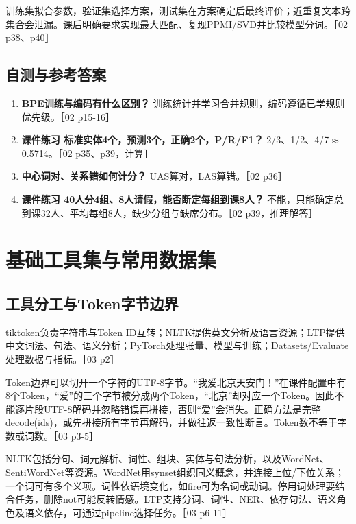 \documentclass[UTF8,a4paper,zihao=-4,fontset=windows]{ctexart}
\begin{document}
训练集拟合参数，验证集选择方案，测试集在方案确定后最终评价；近重复文本跨集合会泄漏。课后明确要求实现最大匹配、复现PPMI/\allowbreak{}SVD并比较模型分词。［02 p38、p40］

\subsection{自测与参考答案}
\begin{enumerate}
\item {}\textbf{BPE训练与编码有什么区别？} 训练统计并学习合并规则，编码遵循已学规则优先级。［02 p15-16］
\item {}\textbf{课件练习 标准实体4个，预测3个，正确2个，P/\allowbreak{}R/\allowbreak{}F1？} 2/\allowbreak{}3、1/\allowbreak{}2、4/\allowbreak{}7\ensuremath{\approx}0.5714。［02 p35、p39，计算］
\item {}\textbf{中心词对、关系错如何计分？} UAS算对，LAS算错。［02 p36］
\item {}\textbf{课件练习 40人分4组、8人请假，能否断定每组到课8人？} 不能，只能确定总到课32人、平均每组8人，缺少分组与缺席分布。［02 p39，推理解答］
\end{enumerate}
\section{基础工具集与常用数据集}
\subsection{工具分工与Token字节边界}
tiktoken负责字符串与Token ID互转；NLTK提供英文分析及语言资源；LTP提供中文词法、句法、语义分析；PyTorch处理张量、模型与训练；Datasets/\allowbreak{}Evaluate处理数据与指标。［03 p2］

Token边界可以切开一个字符的UTF-8字节。“我爱北京天安门！”在课件配置中有8个Token，“爱”的三个字节被分成两个Token，“北京”却对应一个Token。因此不能逐片段UTF-8解码并忽略错误再拼接，否则“爱”会消失。正确方法是完整decode(ids)，或先拼接所有字节再解码，并做往返一致性断言。Token数不等于字数或词数。［03 p3-5］

NLTK包括分句、词元解析、词性、组块、实体与句法分析，以及WordNet、SentiWordNet等资源。WordNet用synset组织同义概念，并连接上位/\allowbreak{}下位关系；一个词可有多个义项。词性依语境变化，如fire可为名词或动词。停用词处理要结合任务，删除not可能反转情感。LTP支持分词、词性、NER、依存句法、语义角色及语义依存，可通过pipeline选择任务。［03 p6-11］
\end{document}
